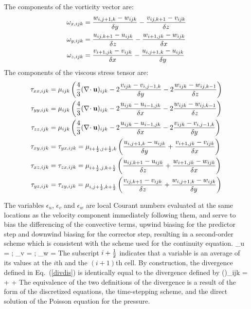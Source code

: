 \noindent The components of the vorticity vector are:
\begin{align}
\omega_{x,ijk} &= \frac{w_{i,j+1,k}-w_{ijk}}{\delta y} -
             \frac{v_{ij,k+1}-v_{ijk}}{ \delta z}  \\
\omega_{y,ijk} &= \frac{u_{ij,k+1}-u_{ijk}}{\delta z} -
             \frac{w_{i+1,jk}-w_{ijk}}{\delta x}  \\
\omega_{z,ijk} &= \frac{v_{i+1,jk}- v_{ijk}}{\delta x} -
             \frac{u_{i,j+1,k}-u_{ijk}}{ \delta y}
\end{align}
\noindent The components of the viscous stress tensor are:
\begin{align}
\tau_{xx,ijk} &= \mu_{ijk} \left( \frac{4}{3} (\nabla\!\cdot {\bf u})_{ijk} - 2 \frac{v_{ijk}-v_{i,j-1,k}}{\delta y} - 2 \frac{w_{ijk}-w_{ij,k-1}}{\delta z} \right)  \\
\tau_{yy,ijk} &= \mu_{ijk} \left( \frac{4}{3} (\nabla\!\cdot {\bf u})_{ijk} - 2 \frac{u_{ijk}-u_{i-1,jk}}{\delta x}  - 2 \frac{w_{ijk}-w_{ij,k-1}}{\delta z} \right)  \\
\tau_{zz,ijk} &= \mu_{ijk} \left( \frac{4}{3} (\nabla\!\cdot {\bf u})_{ijk} - 2 \frac{u_{ijk}-u_{i-1,jk}}{\delta x}  - 2 \frac{v_{ijk}-v_{i,j-1,k}}{\delta y} \right)  \\
\tau_{xy,ijk} &= \tau_{yx,ijk}
        = \mu_{i+\frac{1}{2},j+\frac{1}{2},k} \left( \frac{u_{i,j+1,k}-u_{ijk}}{\delta y}
                         + \frac{v_{i+1,jk} -v_{ijk}}{\delta x} \right) \\
\tau_{xz,ijk} &= \tau_{zx,ijk}
        =\mu_{i+\frac{1}{2},j,k+\frac{1}{2}} \left( \frac{u_{ij,k+1}-u_{ijk}}{\delta z}
                        + \frac{w_{i+1,jk}-w_{ijk}}{\delta x} \right) \\
\tau_{yz,ijk} &= \tau_{zy,ijk}
        =\mu_{i,j+\frac{1}{2},k+\frac{1}{2}} \left( \frac{v_{ij,k+1}-v_{ijk}}{\delta z}
                        + \frac{w_{i,j+1,k}-w_{ijk}}{\delta y} \right)
\end{align}

\noindent The variables $\epsilon_u$, $\epsilon_v$ and $\epsilon_w$ are local
Courant numbers evaluated at the same locations as the velocity component
immediately following them, and serve to bias the differencing of
the convective terms, upwind biasing for the predictor step and downwind biasing for the corrector step, resulting in a second-order scheme
which is consistent with the scheme used for the continuity equation.
\be
\epsilon_u =  \quad ; \quad \epsilon_v =  \quad ; \quad \epsilon_w = 
\ee
The subscript $i+\frac{1}{2}$ indicates that a variable is an average of its
values at the $i$th and the $(i+1)$th cell.
By construction, the divergence defined in Eq.~(\ref{divdis})
is identically equal to the divergence defined by
\be (\nabla\!\cdot \bu)_{ijk} =  +
                                +
                                  \ee
The equivalence of the two definitions of the divergence is a result
of the form of the discretized equations, the time-stepping scheme, and
the direct solution of the Poisson equation for the pressure.



